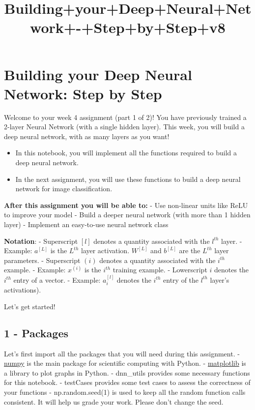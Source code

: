 \documentclass[11pt]{article}
\title{Building+your+Deep+Neural+Network+-+Step+by+Step+v8}
\providecommand{\tightlist}{%
      \setlength{\itemsep}{0pt}\setlength{\parskip}{0pt}}
\begin{document}
    
    
    \maketitle
    
    

    
    \section{Building your Deep Neural Network: Step by
Step}\label{building-your-deep-neural-network-step-by-step}

Welcome to your week 4 assignment (part 1 of 2)! You have previously
trained a 2-layer Neural Network (with a single hidden layer). This
week, you will build a deep neural network, with as many layers as you
want!

\begin{itemize}
\tightlist
\item
  In this notebook, you will implement all the functions required to
  build a deep neural network.
\item
  In the next assignment, you will use these functions to build a deep
  neural network for image classification.
\end{itemize}

\textbf{After this assignment you will be able to:} - Use non-linear
units like ReLU to improve your model - Build a deeper neural network
(with more than 1 hidden layer) - Implement an easy-to-use neural
network class

\textbf{Notation}: - Superscript \([l]\) denotes a quantity associated
with the \(l^{th}\) layer. - Example: \(a^{[L]}\) is the \(L^{th}\)
layer activation. \(W^{[L]}\) and \(b^{[L]}\) are the \(L^{th}\) layer
parameters. - Superscript \((i)\) denotes a quantity associated with the
\(i^{th}\) example. - Example: \(x^{(i)}\) is the \(i^{th}\) training
example. - Lowerscript \(i\) denotes the \(i^{th}\) entry of a vector. -
Example: \(a^{[l]}_i\) denotes the \(i^{th}\) entry of the \(l^{th}\)
layer's activations).

Let's get started!

    \subsection{1 - Packages}\label{packages}

Let's first import all the packages that you will need during this
assignment. - \href{www.numpy.org}{numpy} is the main package for
scientific computing with Python. -
\href{http://matplotlib.org}{matplotlib} is a library to plot graphs in
Python. - dnn\_utils provides some necessary functions for this
notebook. - testCases provides some test cases to assess the correctness
of your functions - np.random.seed(1) is used to keep all the random
function calls consistent. It will help us grade your work. Please don't
change the seed.
\end{document}
